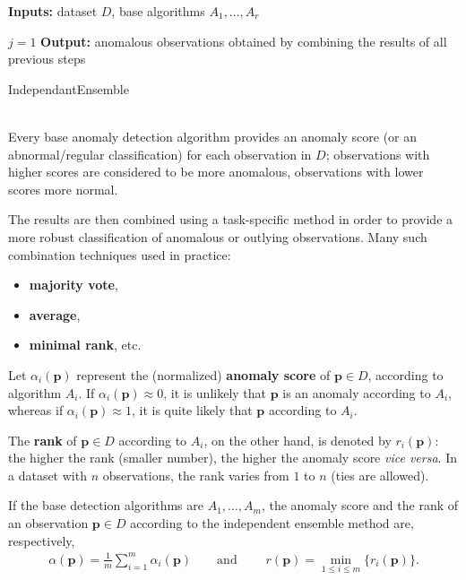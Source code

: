 \begin{algorithm}[t]
\SetAlgoLined
\textbf{Inputs:} dataset $D$, base algorithms $A_1,\ldots,A_r$ 

$j=1$\;
\textbf{Output:} anomalous observations obtained by combining the results of all previous steps 
\caption{IndependantEnsemble}\label{algInd}
\end{algorithm}
\ \\
\noindent Every base anomaly detection algorithm provides an a\-no\-ma\-ly score (or an abnormal/regular classification) for each observation in $D$; observations with higher scores are considered to be more anomalous, observations with lower scores more normal. \par The results are then combined using a task-specific method in order to provide a more robust classification of anomalous or outlying observations. 
\newl Many such combination techniques used in practice:  \begin{itemize}[noitemsep]
\item \textbf{majority vote}, 
\item \textbf{average}, 
\item \textbf{minimal rank}, etc. \end{itemize}  
Let $\alpha_i(\mathbf{p})$ represent the (normalized) \textbf{anomaly score} of $\mathbf{p}\in D$, according to algorithm $A_i$. If $\alpha_i(\mathbf{p})\approx 0$, it is unlikely that $\mathbf{p}$ is an anomaly according to $A_i$, whereas if $\alpha_i(\mathbf{p})\approx 1$, it is quite likely that $\mathbf{p}$ according to $A_i$. \par The \textbf{rank} of $\mathbf{p}\in D$ according to $A_i$, on the other hand, is denoted by $r_i(\mathbf{p})$: the higher the rank (smaller number), the higher the anomaly score  \textit{vice versa}. In a dataset with  $n$ observations, the rank varies from $1$ to $n$ (ties are allowed). 
\par If the base detection algorithms are $A_1, \ldots, A_m$, the anomaly score and the rank of an observation $\mathbf{p}\in D$ according to the independent ensemble method are, respectively, 
\begin{align*}
\alpha(\mathbf{p})=\frac{1}{m}\sum_{i=1}^{m}\alpha_i(\mathbf{p}) \qquad \text{and}\; \qquad r(\mathbf{p}) =\min_{1\leq i \leq m} \{r_i(\mathbf{p})\}.
\end{align*}
